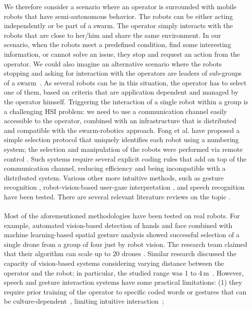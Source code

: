 \documentclass[smallextended]{svjour3}
\begin{document}
We therefore consider a scenario where an operator is surrounded with mobile robots that have semi-autonomous behavior. The robots can be either acting independently or be part of a swarm. 
The operator simply interacts with the robots that are close to her/him and share the same environment.
In our scenario, when the robots meet a predefined condition, find some interesting information, or cannot solve an issue, they stop and request an action from the operator. We could also imagine an alternative scenario where the robots stopping and asking for interaction with the operators are leaders of sub-groups of a swarm~\cite{Goodrich2012}. As several robots can be in this situation, the operator has to select one of them, based on criteria that are application dependent and managed by the operator himself. Triggering the interaction of a single robot within a group is a challenging HSI problem: we need to use a communication channel easily accessible to the operator, combined with an infrastructure that is distributed and compatible with the swarm-robotics approach.
Fong et al. have proposed a simple selection protocol that uniquely identifies each robot using a numbering system; the selection and manipulation of the robots were performed via remote control \cite{fong2003}. 
Such systems require several explicit coding rules that add on top of the communication channel, reducing efficiency and being incompatible with a distributed system. 
Various other more intuitive methods, such as gesture recognition \cite{Couture-Beil2010,Jones2010,Monajjemi2013,Nagietal2014}, robot-vision-based user-gaze interpretation \cite{Couture-Beil2010,Monajjemi2013,Pourmehr2013}, and speech recognition \cite{Pourmehr2013} have been tested. 
There are several relevant literature reviews on the topic \cite{goodrich2007human,Kolling2016,yanco2004classifying}.\\
\\
Most of the aforementioned methodologies have been tested on real robots. 
For example, automated vision-based detection of hands and face combined with machine learning-based spatial gesture analysis showed successful selection of a single drone from a group of four just by robot vision. 
The research team claimed that their algorithm can scale up to 20 drones \cite{Nagietal2014}. Similar research discussed the capacity of vision-based systems considering varying distance between the operator and the robot; in particular, the studied range was 1 to 4\,m~\cite{Couture-Beil2010}. 
However, speech and gesture interaction systems have some practical limitations: (1) they require prior training of the operator to specific coded words or gestures that can be culture-dependent~\cite{Trovato2013}, limiting intuitive interaction~\cite{Kirchner2015};
\end{document}
